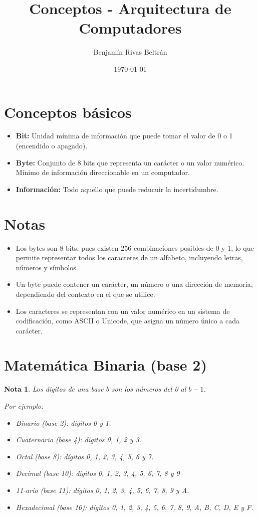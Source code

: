\documentclass{article}
\title{Conceptos - Arquitectura de Computadores}
\author{Benjamín Rivas Beltrán}
\date{\today}
\newtheorem{remark}{Nota}[section]
\begin{document}
\maketitle

\section{Conceptos básicos}

\begin{itemize}
  \item \textbf{Bit:} Unidad mínima de información que puede tomar el valor de 0 o 1 (encendido o apagado).
  \item \textbf{Byte:} Conjunto de 8 bits que representa un carácter o un valor numérico. Mínimo de información direccionable en un computador.
  \item \textbf{Información:} Todo aquello que puede reducuir la incertidumbre.
\end{itemize}

\section{Notas}

\begin{itemize}
  \item Los bytes son 8 bits, pues existen 256 combinaciones posibles de 0 y 1, lo que permite representar todos los caracteres de un alfabeto, incluyendo letras, números y símbolos.
  \item Un byte puede contener un carácter, un número o una dirección de memoria, dependiendo del contexto en el que se utilice.
  \item Los caracteres se representan con un valor numérico en un sistema de codificación, como ASCII o Unicode, que asigna un número único a cada carácter.
\end{itemize}

\section{Matemática Binaria (base 2)}

\begin{remark}
  Los digitos de una base $b$ son los números del 0 al $b-1$.

  Por ejemplo:
  \begin{itemize}
    \item Binario (base 2): dígitos 0 y 1.
    \item Cuaternario (base 4): dígitos 0, 1, 2 y 3.
    \item Octal (base 8): dígitos 0, 1, 2, 3, 4, 5, 6 y 7.
    \item Decimal (base 10): dígitos 0, 1, 2, 3, 4, 5, 6, 7, 8 y 9
    \item 11-ario (base 11): dígitos 0, 1, 2, 3, 4, 5, 6, 7, 8, 9 y A.
    \item Hexadecimal (base 16): dígitos 0, 1, 2, 3, 4, 5, 6, 7, 8, 9, A, B, C, D, E y F.
  \end{itemize}
\end{remark}
\end{document}

